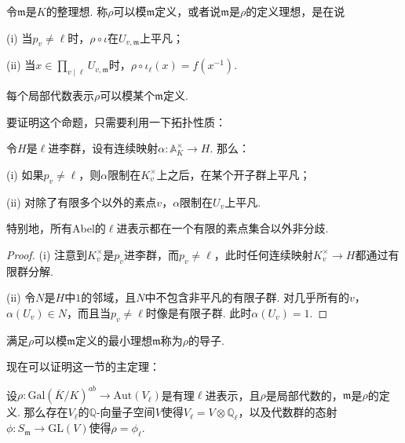 \begin{cdef}
    令$\mathfrak{m}$是$K$的整理想. 称$\rho$可以模$\mathfrak{m}$定义，或者说$\mathfrak{m}$是$\rho$的定义理想，是在说

    (i) 当$p_v\neq \ell$时，$\rho\circ \iota$在$U_{v, \mathfrak{m}}$上平凡；

    (ii) 当$x\in \prod_{v\mid \ell} U_{v, \mathfrak{m}}$时，$\rho\circ\iota_{\ell} (x) = f(x^{-1})$.
\end{cdef}

\begin{cprop}
    每个局部代数表示$\rho$可以模某个$\mathfrak{m}$定义.
\end{cprop}

要证明这个命题，只需要利用一下拓扑性质：

\begin{clem}
    令$H$是$\ell$进李群，设有连续映射$\alpha: \mathbb{A}_{K}^{\times}\to H$. 那么：

    (i) 如果$p_v\neq \ell$，则$\alpha$限制在$K_v^{\times}$上之后，在某个开子群上平凡；

    (ii) 对除了有限多个以外的素点$v$，$\alpha$限制在$U_v$上平凡.

    特别地，所有Abel的$\ell$进表示都在一个有限的素点集合以外非分歧.
\end{clem}

\begin{proof}
    (i) 注意到$K_v^{\times}$是$p_v$进李群，而$p_v\neq \ell$，此时任何连续映射$K_v^{\times}\to H$都通过有限群分解.

    (ii) 令$N$是$H$中$1$的邻域，且$N$中不包含非平凡的有限子群. 对几乎所有的$v$，$\alpha(U_v)\in N$，而且当$p_v\neq \ell$时像是有限子群. 此时$\alpha(U_v)=1$.
\end{proof}

满足$\rho$可以模$\mathfrak{m}$定义的最小理想$\mathfrak{m}$称为$\rho$的导子.

现在可以证明这一节的主定理：

\begin{cthm}
    设$\rho: \mathrm{Gal}(\overline{K}/K)^{ab} \to \mathrm{Aut}(V_{\ell})$是有理$\ell$进表示，且$\rho$是局部代数的，$\mathfrak{m}$是$\rho$的定义\modulus . 那么存在$V_{\ell}$的$\mathbb{Q}$-向量子空间$V$使得$V_{\ell} = V\otimes \mathbb{Q}_{\ell}$，以及代数群的态射$\phi: S_{\mathfrak{m}}\to \mathrm{GL}(V)$使得$\rho=\phi_{\ell}$. \label{galois::when_sm}
\end{cthm}



